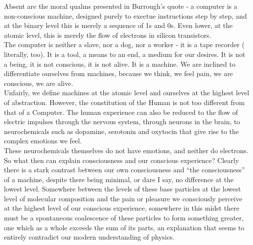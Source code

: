 \documentclass[11pt]{article}
\begin{document}
Absent are the moral qualms presented in Burrough's quote - a computer is a non-conscious machine, designed purely to exectue instructions step by step, and at the binary level this is merely a sequence of 1s and 0s. Even lower, at the atomic level, this is merely the flow of electrons in silicon transistors. \\

The computer is neither a slave, nor a dog, nor a worker - it is a tape recorder ( literally, too). It is a tool, a means to an end, a medium for our desires. It is not a being, it is not conscious, it is not alive. It is a machine. We are inclined to differentiate ourselves from machines, because we think, we feel pain, we are conscious, we are alive. \\

Unfairly, we define machines at the atomic level and ourselves at the highest level of abstraction. However, the constitution of the Human is not too different from that of a Computer. The human experience can also be reduced to the flow of electric impulses through the nervous system, through neurons in the brain, to neurochemicals such as dopamine, serotonin and oxytocin that give rise to the complex emotions we feel. \\

These neurochemicals themselves do not have emotions, and neither do electrons. So what then can explain consciousness and our conscious experience? Clearly there is a stark contrast between our own consciousness and “the consciousness” of a machine, despite there being minimal, or dare I say, no difference at the lowest level. Somewhere between the levels of these base particles at the lowest level of molecular composition and the pain or pleasure we consciously perceive at the highest level of our conscious experience, somewhere in this midst there must be a spontaneous coalescence of these particles to form something greater, one which as a whole exceeds the sum of its parts, an explanation that seems to entirely contradict our modern understanding of physics. \\
\end{document}
